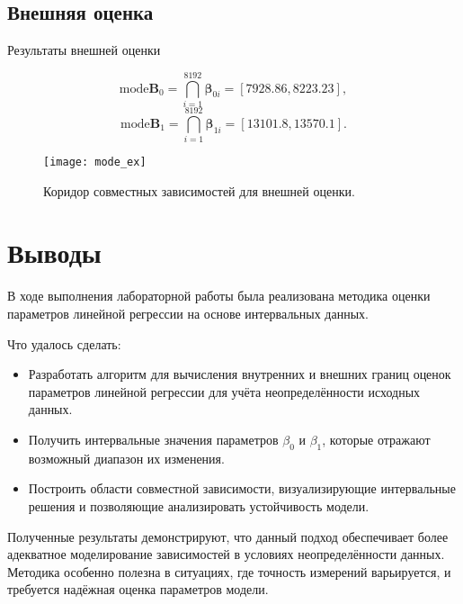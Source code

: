 \documentclass{article}
\begin{document}
  \subsection{Внешняя оценка}

  Результаты внешней оценки

  \[
    \text{mode} \mathbf{B}_0 = \bigcap_{i=1}^{8192} \mathbf{\beta}_{0i}
      = [7928.86, 8223.23],
  \]
  \[
    \text{mode} \mathbf{B}_1 = \bigcap_{i=1}^{8192} \mathbf{\beta}_{1i}
      = [13101.8, 13570.1].
  \]

    \begin{figure}[htbp!]
        \begin{center}
            \texttt{[image: mode\_ex]}
            \caption{Коридор совместных зависимостей для внешней оценки.}
    \label{figure:ext_est}
        \end{center}
    \end{figure}

    \clearpage
    \section{Выводы}
    В ходе выполнения лабораторной работы была реализована методика оценки  
    параметров линейной регрессии на основе интервальных данных. 

    Что удалось сделать:
    
    \begin{itemize}  
      \item Разработать алгоритм для вычисления внутренних и внешних границ  
        оценок параметров линейной регрессии для учёта  
        неопределённости исходных данных.  
      \item Получить интервальные значения параметров \( \beta_0 \) и  
        \( \beta_1 \), которые отражают возможный диапазон их изменения.  
      \item Построить области совместной зависимости, визуализирующие  
        интервальные решения и позволяющие анализировать устойчивость модели.  
    \end{itemize}  
    
    Полученные результаты демонстрируют, что данный подход обеспечивает более  
    адекватное моделирование зависимостей в условиях неопределённости данных.  
    Методика особенно полезна в ситуациях, где точность измерений  
    варьируется, и требуется надёжная оценка параметров модели.  
  
\end{document}
